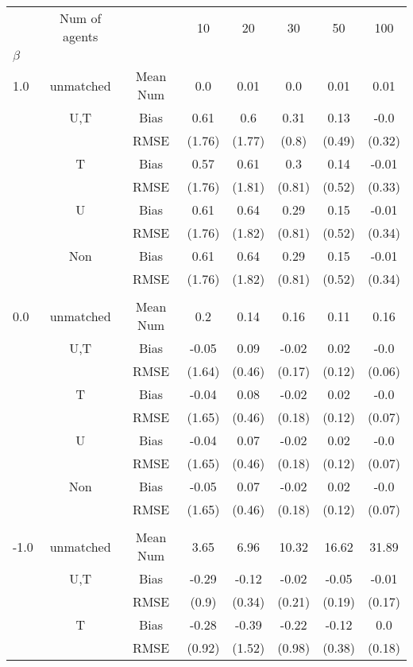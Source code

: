 \begin{tabular}{@{\extracolsep{5pt}}lc|cccccc}
\toprule 
 & Num of agents &  & 10 & 20 & 30 & 50 & 100 \\
$\beta$ &  &  &  &  &  &  &  \\
\midrule 
1.0 & unmatched & Mean Num & 0.0 & 0.01 & 0.0 & 0.01 & 0.01 \\
 & U,T & Bias & 0.61 & 0.6 & 0.31 & 0.13 & -0.0 \\
 &  & RMSE & (1.76) & (1.77) & (0.8) & (0.49) & (0.32) \\
 & T & Bias & 0.57 & 0.61 & 0.3 & 0.14 & -0.01 \\
 &  & RMSE & (1.76) & (1.81) & (0.81) & (0.52) & (0.33) \\
 & U & Bias & 0.61 & 0.64 & 0.29 & 0.15 & -0.01 \\
 &  & RMSE & (1.76) & (1.82) & (0.81) & (0.52) & (0.34) \\
 & Non & Bias & 0.61 & 0.64 & 0.29 & 0.15 & -0.01 \\
 &  & RMSE & (1.76) & (1.82) & (0.81) & (0.52) & (0.34) \\
 &  &  &  &  &  &  &  \\
0.0 & unmatched & Mean Num & 0.2 & 0.14 & 0.16 & 0.11 & 0.16 \\
 & U,T & Bias & -0.05 & 0.09 & -0.02 & 0.02 & -0.0 \\
 &  & RMSE & (1.64) & (0.46) & (0.17) & (0.12) & (0.06) \\
 & T & Bias & -0.04 & 0.08 & -0.02 & 0.02 & -0.0 \\
 &  & RMSE & (1.65) & (0.46) & (0.18) & (0.12) & (0.07) \\
 & U & Bias & -0.04 & 0.07 & -0.02 & 0.02 & -0.0 \\
 &  & RMSE & (1.65) & (0.46) & (0.18) & (0.12) & (0.07) \\
 & Non & Bias & -0.05 & 0.07 & -0.02 & 0.02 & -0.0 \\
 &  & RMSE & (1.65) & (0.46) & (0.18) & (0.12) & (0.07) \\
 &  &  &  &  &  &  &  \\
-1.0 & unmatched & Mean Num & 3.65 & 6.96 & 10.32 & 16.62 & 31.89 \\
 & U,T & Bias & -0.29 & -0.12 & -0.02 & -0.05 & -0.01 \\
 &  & RMSE & (0.9) & (0.34) & (0.21) & (0.19) & (0.17) \\
 & T & Bias & -0.28 & -0.39 & -0.22 & -0.12 & 0.0 \\
 &  & RMSE & (0.92) & (1.52) & (0.98) & (0.38) & (0.18) \\

\end{tabular}
